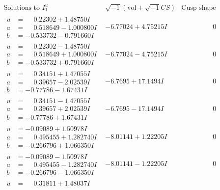 \documentclass[1p]{elsarticle_modified}
\theoremstyle{definition}
\newcommand{\I}{\sqrt{-1}}
\begin{document}
$$\begin{array}{c|c|c}
\text{Solutions to }I^u_{1}& \I (\text{vol} + \sqrt{-1}CS) & \text{Cusp shape}\\
 \hline 
\begin{aligned}
u &= \phantom{-}0.22302 + 1.48750 I \\
a &= \phantom{-}0.518649 - 1.000800 I \\
b &= -0.533732 - 0.791660 I\end{aligned}
 & -6.77024 + 4.75215 I & \phantom{-0.000000 } 0 \\ \hline\begin{aligned}
u &= \phantom{-}0.22302 - 1.48750 I \\
a &= \phantom{-}0.518649 + 1.000800 I \\
b &= -0.533732 + 0.791660 I\end{aligned}
 & -6.77024 - 4.75215 I & \phantom{-0.000000 } 0 \\ \hline\begin{aligned}
u &= \phantom{-}0.34151 + 1.47055 I \\
a &= \phantom{-}0.39657 - 2.02539 I \\
b &= -0.77786 - 1.67431 I\end{aligned}
 & -6.7695 + 17.1494 I & \phantom{-0.000000 } 0 \\ \hline\begin{aligned}
u &= \phantom{-}0.34151 - 1.47055 I \\
a &= \phantom{-}0.39657 + 2.02539 I \\
b &= -0.77786 + 1.67431 I\end{aligned}
 & -6.7695 - 17.1494 I & \phantom{-0.000000 } 0 \\ \hline\begin{aligned}
u &= -0.09089 + 1.50978 I \\
a &= \phantom{-}0.495455 + 1.282740 I \\
b &= -0.266796 + 1.066350 I\end{aligned}
 & -8.01141 + 1.22205 I & \phantom{-0.000000 } 0 \\ \hline\begin{aligned}
u &= -0.09089 - 1.50978 I \\
a &= \phantom{-}0.495455 - 1.282740 I \\
b &= -0.266796 - 1.066350 I\end{aligned}
 & -8.01141 - 1.22205 I & \phantom{-0.000000 } 0 \\ \hline\begin{aligned}
u &= \phantom{-}0.31811 + 1.48037 I \\

\end{aligned}
\end{array}$$
\end{document}
